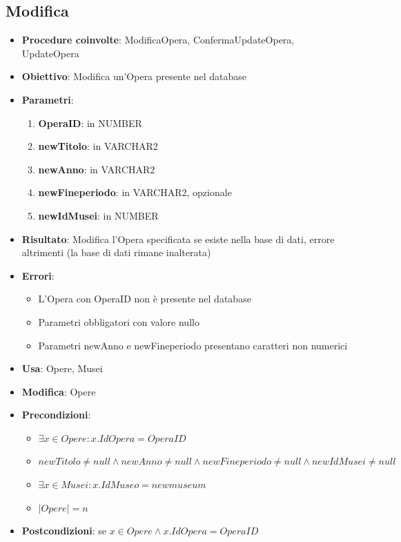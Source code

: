 \subsection{Modifica}
\begin{itemize}
	\item \textbf{Procedure coinvolte}: ModificaOpera, ConfermaUpdateOpera, UpdateOpera
	\item \textbf{Obiettivo}: Modifica un'Opera presente nel database
	\item \textbf{Parametri}:
	\begin{enumerate}
		\item \textbf{OperaID}: in NUMBER
		\item \textbf{newTitolo}: in VARCHAR2
		\item \textbf{newAnno}: in VARCHAR2
		\item \textbf{newFineperiodo}: in VARCHAR2, opzionale
		\item \textbf{newIdMusei}: in NUMBER
	\end{enumerate}
	\item \textbf{Risultato}: Modifica l'Opera specificata se esiste nella base di dati, errore altrimenti (la base di dati rimane inalterata)
	\item \textbf{Errori}: 
	\begin{itemize}
		\item L'Opera con OperaID non è presente nel database
		\item Parametri obbligatori con valore nullo
		\item Parametri newAnno e newFineperiodo presentano caratteri non numerici
	\end{itemize}
	\item \textbf{Usa}: Opere, Musei
	\item \textbf{Modifica}: Opere
	\item \textbf{Precondizioni}:
	\begin{itemize}
		\item $\exists x \in Opere : x.IdOpera = OperaID$
		\item $newTitolo \ne null \land newAnno \ne null \land newFineperiodo \ne null \land newIdMusei \ne null$
		\item $\exists x \in Musei : x.IdMuseo = newmuseum$
		\item $|Opere| = n$
	\end{itemize}
	\item \textbf{Postcondizioni}: se $x \in Opere \land x.IdOpera = OperaID$
	\begin{itemize}

\end{itemize}
\end{itemize}
